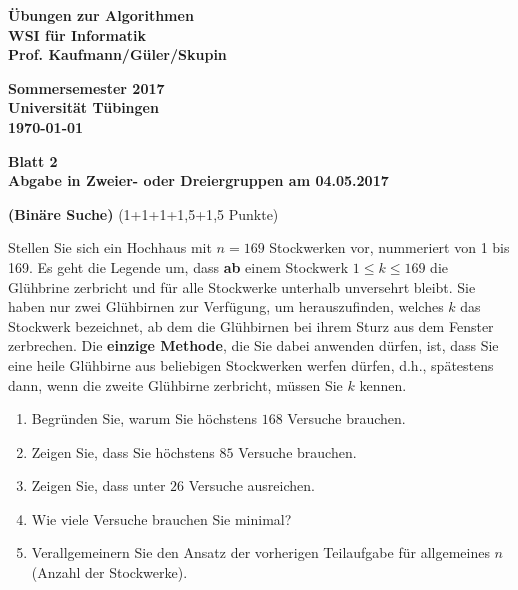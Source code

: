 \documentclass{article}
\begin{document}
\thispagestyle{empty}
\noindent
\begin{minipage}[t]{0.6\textwidth}
\begin{flushleft}
\bf Übungen zur Algorithmen\\
WSI für Informatik\\
Prof. Kaufmann/Güler/Skupin
\end{flushleft}
\end{minipage}
\begin{minipage}[t]{0.4\textwidth}
\begin{flushright}
\bf Sommersemester 2017\\
Universität Tübingen\\
\today
\end{flushright}
\end{minipage}

\setlength{\parindent}{0pt}
\setlength{\parskip}{6pt}

\renewcommand{\labelenumi}{\alph{enumi})}

\vspace*{.3cm}

\begin{center}

\textbf{ \Large  Blatt 2} \\ 
\textbf{Abgabe {\color{red} in Zweier- oder Dreiergruppen} am 04.05.2017}

\end{center}

\vskip 0.3cm

  \quad\textbf{(Binäre Suche)} \quad(1+1+1+1{,}5+1{,}5 Punkte)

\noindent
Stellen Sie sich ein Hochhaus mit $n=169$ Stockwerken vor, nummeriert von 1 bis 169. Es geht die Legende um, dass \textbf{ab} einem Stockwerk $1\leq k \leq 169$ die Glühbrine zerbricht und für alle Stockwerke unterhalb unversehrt bleibt. Sie haben nur zwei Glühbirnen zur Verfügung, um herauszufinden, welches $k$ das Stockwerk bezeichnet, ab dem die Glühbirnen bei ihrem Sturz aus dem Fenster zerbrechen. Die {\bf einzige Methode}, die Sie dabei anwenden dürfen, ist, dass Sie eine heile Glühbirne aus beliebigen Stockwerken werfen dürfen, d.h., spätestens dann, wenn die zweite Glühbirne zerbricht, müssen Sie $k$ kennen.
\begin{enumerate}
\item Begründen Sie, warum Sie höchstens $168$ Versuche brauchen.
\item Zeigen Sie, dass Sie höchstens $85$ Versuche brauchen.
\item Zeigen Sie, dass unter $26$ Versuche ausreichen.
\item Wie viele Versuche brauchen Sie minimal? 
\item Verallgemeinern Sie den Ansatz der vorherigen Teilaufgabe für allgemeines $n$ (Anzahl der Stockwerke). 
\end{enumerate}
\end{document}
